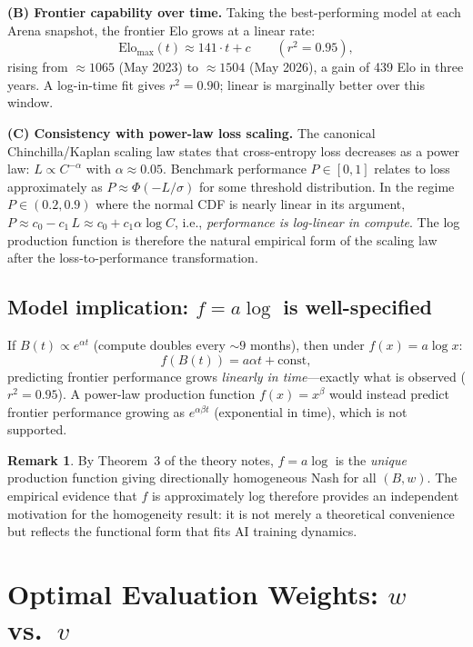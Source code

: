 \documentclass{article}
\theoremstyle{definition}
\newtheorem{remark}{Remark}
\begin{document}
\medskip\noindent\textbf{(B) Frontier capability over time.}
Taking the best-performing model at each Arena snapshot, the frontier Elo
grows at a linear rate:
\[
  \text{Elo}_{\max}(t) \approx 141 \cdot t + c \qquad (r^2 = 0.95),
\]
rising from $\approx 1065$ (May 2023) to $\approx 1504$ (May 2026), a gain
of 439 Elo in three years.  A log-in-time fit gives $r^2 = 0.90$; linear
is marginally better over this window.

\medskip\noindent\textbf{(C) Consistency with power-law loss scaling.}
The canonical Chinchilla/Kaplan scaling law states that cross-entropy loss
decreases as a power law: $L \propto C^{-\alpha}$ with $\alpha \approx 0.05$.
Benchmark performance $P \in [0,1]$ relates to loss approximately as
$P \approx \Phi(-L/\sigma)$ for some threshold distribution.  In the regime
$P \in (0.2, 0.9)$ where the normal CDF is nearly linear in its argument,
$P \approx c_0 - c_1 \, L \approx c_0 + c_1 \alpha \log C$, i.e.,
\emph{performance is log-linear in compute}.  The log production function
is therefore the natural empirical form of the scaling law after
the loss-to-performance transformation.

\subsection*{Model implication: $f = a\log$ is well-specified}

If $B(t) \propto e^{\alpha t}$ (compute doubles every $\sim 9$ months), then
under $f(x) = a\log x$:
\[
  f(B(t)) = a\alpha t + \text{const},
\]
predicting frontier performance grows \emph{linearly in time}---exactly
what is observed ($r^2 = 0.95$).  A power-law production function
$f(x) = x^\beta$ would instead predict frontier performance growing as
$e^{\alpha\beta t}$ (exponential in time), which is not supported.

\begin{remark}
By Theorem~3 of the theory notes, $f = a\log$ is the \emph{unique} production
function giving directionally homogeneous Nash for all $(B, w)$.  The empirical
evidence that $f$ is approximately log therefore provides an independent
motivation for the homogeneity result: it is not merely a theoretical
convenience but reflects the functional form that fits AI training dynamics.
\end{remark}


\section{Optimal Evaluation Weights: $w$ vs.\ $v$}
\end{document}
